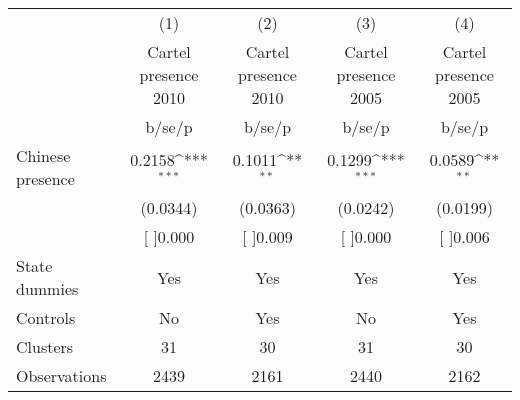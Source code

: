 {
\def\sym#1{\ifmmode^{#1}\else\(^{#1}\)\fi}
\begin{tabular}{l*{4}{c}}
\hline\hline
                    &\multicolumn{1}{c}{(1)}&\multicolumn{1}{c}{(2)}&\multicolumn{1}{c}{(3)}&\multicolumn{1}{c}{(4)}\\
                    &\multicolumn{1}{c}{Cartel presence 2010}&\multicolumn{1}{c}{Cartel presence 2010}&\multicolumn{1}{c}{Cartel presence 2005}&\multicolumn{1}{c}{Cartel presence 2005}\\
                    &      b/se/p         &      b/se/p         &      b/se/p         &      b/se/p         \\
\hline
Chinese presence    &      0.2158\sym{***}&      0.1011\sym{**} &      0.1299\sym{***}&      0.0589\sym{**} \\
                    &    (0.0344)         &    (0.0363)         &    (0.0242)         &    (0.0199)         \\
                    &    [ ]0.000         &    [ ]0.009         &    [ ]0.000         &    [ ]0.006         \\
\hline
State dummies       &         Yes         &         Yes         &         Yes         &         Yes         \\
Controls            &          No         &         Yes         &          No         &         Yes         \\
Clusters            &          31         &          30         &          31         &          30         \\
Observations        &        2439         &        2161         &        2440         &        2162         \\
\hline\hline
\end{tabular}
}
